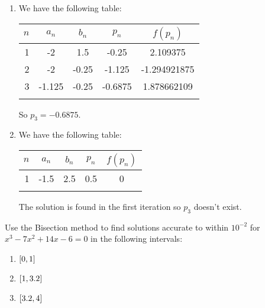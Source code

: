\documentclass[../../Assignments.tex]{subfiles}
\begin{document}
\begin{solution}
    \begin{enumerate}[label = (\alph*)]
        \item We have the following table:

            \begin{tabular}{r S[table-format=-1.3] S[table-format=-1.2] S[table-format=-1.4] S[table-format=-1.9]}
                \\
                \toprule
                \(n\)  &  {\(a_n\)}  &  {\(b_n\)}  &  {\(p_n\)}  &  {\(f(p_n)\)}  \\
                  &  -2         &   1.5       &  -0.25      &   2.109375     \\
                    2  &  -2         &  -0.25      &  -1.125     &  -1.294921875  \\
                    3  &  -1.125     &  -0.25      &  -0.6875    &   1.878662109  \\
                \bottomrule
                \\
            \end{tabular}

            So \(p_3 = \num{-0.6875}\).

        \item We have the following table:

            \begin{tabular}{r S[table-format=-1.1] S[table-format=-1.1] S[table-format=1.1] S[table-format=1.1]}
                \\
                \toprule
                \(n\)  &  {\(a_n\)}  &  {\(b_n\)}  &  {\(p_n\)}  &  {\(f(p_n)\)}  \\
                   &  -1.5       &   2.5       &   0.5       &   0            \\
                \bottomrule
                \\
            \end{tabular}

            The solution is found in the first iteration so \(p_3\) doesn't
            exist.
    \end{enumerate}
\end{solution}

\begin{exercise}
    Use the Bisection method to find solutions accurate to within \(10^{-2}\)
    for \(x^3 - 7x^2 + 14x - 6 = 0\) in the following intervals:

    \begin{enumerate}[label=(\alph*)]
        \item \(\interval{0}{1}\)
        \item \(\interval{1}{\num{3.2}}\)
        \item \(\interval{\num{3.2}}{4}\)
    \end{enumerate}
\end{exercise}
\end{document}
